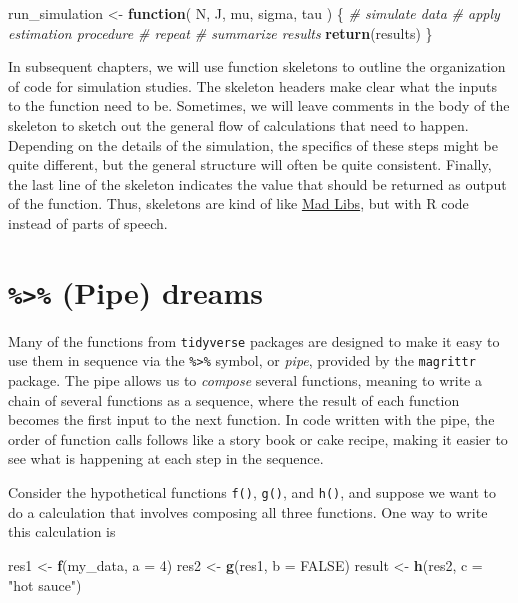 \documentclass[
]{book}
\newenvironment{Shaded}{\begin{snugshade}}{\end{snugshade}}
\newcommand{\AttributeTok}[1]{\textcolor[rgb]{0.13,0.29,0.53}{#1}}
\newcommand{\CommentTok}[1]{\textcolor[rgb]{0.56,0.35,0.01}{\textit{#1}}}
\newcommand{\ConstantTok}[1]{\textcolor[rgb]{0.56,0.35,0.01}{#1}}
\newcommand{\ControlFlowTok}[1]{\textcolor[rgb]{0.13,0.29,0.53}{\textbf{#1}}}
\newcommand{\DecValTok}[1]{\textcolor[rgb]{0.00,0.00,0.81}{#1}}
\newcommand{\FunctionTok}[1]{\textcolor[rgb]{0.13,0.29,0.53}{\textbf{#1}}}
\newcommand{\NormalTok}[1]{#1}
\newcommand{\OtherTok}[1]{\textcolor[rgb]{0.56,0.35,0.01}{#1}}
\newcommand{\StringTok}[1]{\textcolor[rgb]{0.31,0.60,0.02}{#1}}
\begin{document}
\begin{Shaded}
\begin{Highlighting}[]
\NormalTok{run\_simulation }\OtherTok{\textless{}{-}} \ControlFlowTok{function}\NormalTok{( N, J, mu, sigma, tau ) \{}
  \CommentTok{\# simulate data}
  \CommentTok{\# apply estimation procedure}
  \CommentTok{\# repeat}
  \CommentTok{\# summarize results}
  \FunctionTok{return}\NormalTok{(results)}
\NormalTok{\}}
\end{Highlighting}
\end{Shaded}

In subsequent chapters, we will use function skeletons to outline the organization of code for simulation studies.
The skeleton headers make clear what the inputs to the function need to be.
Sometimes, we will leave comments in the body of the skeleton to sketch out the general flow of calculations that need to happen.
Depending on the details of the simulation, the specifics of these steps might be quite different, but the general structure will often be quite consistent.
Finally, the last line of the skeleton indicates the value that should be returned as output of the function.
Thus, skeletons are kind of like \href{https://www.madlibs.com/}{Mad Libs}, but with R code instead of parts of speech.

\section{\texorpdfstring{\texttt{\%\textgreater{}\%} (Pipe) dreams}{\%\textgreater\% (Pipe) dreams}}\label{pipe-dreams}

Many of the functions from \texttt{tidyverse} packages are designed to make it easy to use them in sequence via the \texttt{\%\textgreater{}\%} symbol, or \emph{pipe}, provided by the \texttt{magrittr} package.
The pipe allows us to \emph{compose} several functions, meaning to write a chain of several functions as a sequence, where the result of each function becomes the first input to the next function.
In code written with the pipe, the order of function calls follows like a story book or cake recipe, making it easier to see what is happening at each step in the sequence.

Consider the hypothetical functions \texttt{f()}, \texttt{g()}, and \texttt{h()}, and suppose we want to do a calculation that involves composing all three functions.
One way to write this calculation is

\begin{Shaded}
\begin{Highlighting}[]
\NormalTok{res1 }\OtherTok{\textless{}{-}} \FunctionTok{f}\NormalTok{(my\_data, }\AttributeTok{a =} \DecValTok{4}\NormalTok{)}
\NormalTok{res2 }\OtherTok{\textless{}{-}} \FunctionTok{g}\NormalTok{(res1, }\AttributeTok{b =} \ConstantTok{FALSE}\NormalTok{)}
\NormalTok{result }\OtherTok{\textless{}{-}} \FunctionTok{h}\NormalTok{(res2, }\AttributeTok{c =} \StringTok{"hot sauce"}\NormalTok{)}
\end{Highlighting}
\end{Shaded}
\end{document}
